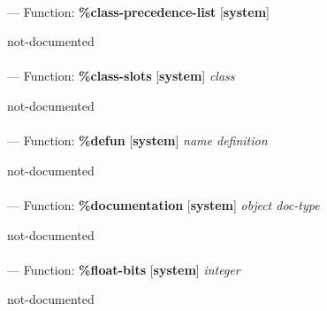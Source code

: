 \paragraph{}
\label{SYSTEM:CLASS-PRECEDENCE-LIST}
--- Function: \textbf{\%class-precedence-list} [\textbf{system}] \textit{}

\begin{adjustwidth}{5em}{5em}
not-documented
\end{adjustwidth}

\paragraph{}
\label{SYSTEM:CLASS-SLOTS}
--- Function: \textbf{\%class-slots} [\textbf{system}] \textit{class}

\begin{adjustwidth}{5em}{5em}
not-documented
\end{adjustwidth}

\paragraph{}
\label{SYSTEM:DEFUN}
--- Function: \textbf{\%defun} [\textbf{system}] \textit{name definition}

\begin{adjustwidth}{5em}{5em}
not-documented
\end{adjustwidth}

\paragraph{}
\label{SYSTEM:DOCUMENTATION}
--- Function: \textbf{\%documentation} [\textbf{system}] \textit{object doc-type}

\begin{adjustwidth}{5em}{5em}
not-documented
\end{adjustwidth}

\paragraph{}
\label{SYSTEM:FLOAT-BITS}
--- Function: \textbf{\%float-bits} [\textbf{system}] \textit{integer}

\begin{adjustwidth}{5em}{5em}
not-documented
\end{adjustwidth}

